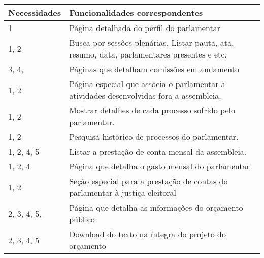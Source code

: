 \documentclass[12pt, a4paper]{article}
\begin{document}
            \begin{longtabu}{X[-1, r]| X}
                \hline
                \textbf{Necessidades} &
                \textbf{Funcionalidades correspondentes}
                \\ \hline

                1 &
                Página detalhada do perfil do parlamentar
                \\ \hline

                1, 2 &
                Busca por sessões plenárias. Listar pauta, ata, resumo, data,
                parlamentares presentes e etc.
                \\ \hline

                3, 4,  &
                Páginas que detalham comissões em andamento
                \\ \hline

                1, 2 &
                Página especial que associa o parlamentar a atividades
                desenvolvidas fora a assembleia.
                \\ \hline

                1, 2 &
                Mostrar detalhes de cada processo sofrido pelo parlamentar.
                \\ \hline

                1, 2 &
                Pesquisa histórico de processos do parlamentar.
                \\ \hline

                1, 2, 4, 5 &
                Listar a prestação de conta mensal da assembleia.
                \\ \hline

                1, 2, 4 &
                Página que detalha o gasto mensal do parlamentar
                \\ \hline

                1, 2 &
                Seção especial para a prestação de contas do parlamentar à
                justiça eleitoral
                \\ \hline

                2, 3, 4, 5, &
                Página que detalha as informações do orçamento público
                \\ \hline

                2, 3, 4, 5 &
                Download do texto na íntegra do projeto do orçamento
                \\ \hline


\end{longtabu}
\end{document}
